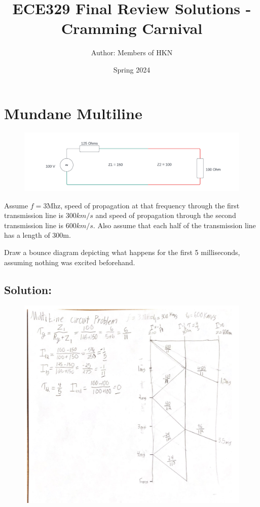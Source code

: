 \documentclass{article}
\title{ECE329 Final Review Solutions - Cramming Carnival}
\author{Author: Members of HKN}
\date{Spring 2024}
\begin{document}
\maketitle

\section{Mundane Multiline}

\begin{figure}[h]
\begin{center}
    \includegraphics[width=
    \textwidth]{figures/Multiline_Example.png}
\end{center}
\end{figure}

Assume $f = 3$Mhz, speed of propagation at that frequency through the first transmission line is $300 km/s$ and speed of propagation through the second transmission line is $600 km/s$. Also assume that each half of the transmission line has a length of 300m.

Draw a bounce diagram depicting what happens for the first 5 milliseconds, assuming nothing was excited beforehand.

\subsection{Solution:}

\begin{figure}[H]
\begin{center}
    \includegraphics[width=
    \textwidth]{figures/Multiline_Solution.jpg}
\end{center}
\end{figure}
\end{document}

